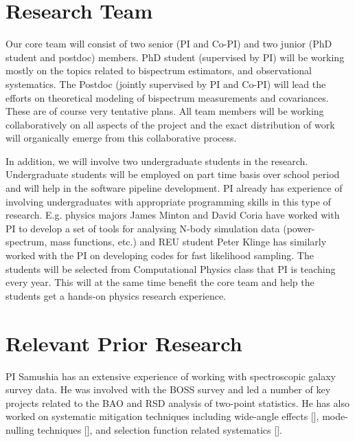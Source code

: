 \section{Research Team}

Our core team will consist of two senior (PI and Co-PI) and two junior (PhD
student and postdoc) members. PhD student (supervised by PI) will be working
mostly on the topics related to bispectrum estimators, and observational
systematics. The Postdoc (jointly supervised by PI and Co-PI) will lead the
efforts on theoretical modeling of bispectrum measurements and covariances.
These are of course very tentative plans. All team members will be working
collaboratively on all aspects of the project and the exact distribution of
work will organically emerge from this collaborative process. 

In addition, we will involve two undergraduate students in the research.
Undergraduate students will be employed on part time basis over school period
and will help in the software pipeline development. PI already has experience
of involving undergraduates with appropriate programming skills in this type of
research. E.g. physics majors James Minton and David Coria have worked with PI
to develop a set of tools for analysing N-body simulation data (power-spectrum,
mass functions, etc.) and REU student Peter Klinge has similarly worked with
the PI on developing codes for fast likelihood sampling. The students will be
selected from Computational Physics class that PI is teaching every year. This
will at the same time benefit the core team and help the students get a
hands-on physics research experience.







\section{Relevant Prior Research}

PI Samushia has an extensive experience of working with spectroscopic galaxy
survey data. He was involved with the BOSS survey and led a number of key
projects related to the BAO and RSD analysis of two-point statistics. He has
also worked on systematic mitigation techniques including wide-angle effects
[], mode-nulling techniques [], and selection function related systematics [].

